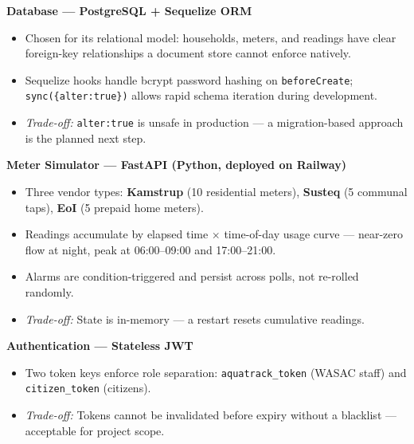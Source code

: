 
\textbf{Database --- PostgreSQL + Sequelize ORM}
\begin{itemize}
  \item Chosen for its relational model: households, meters, and readings have clear foreign-key relationships a document store cannot enforce natively.
  \item Sequelize hooks handle bcrypt password hashing on \texttt{beforeCreate}; \texttt{sync(\{alter:true\})} allows rapid schema iteration during development.
  \item \textit{Trade-off:} \texttt{alter:true} is unsafe in production --- a migration-based approach is the planned next step.
\end{itemize}

\vspace{0.3em}
\textbf{Meter Simulator --- FastAPI (Python, deployed on Railway)}
\begin{itemize}
  \item Three vendor types: \textbf{Kamstrup} (10 residential meters), \textbf{Susteq} (5 communal taps), \textbf{EoI} (5 prepaid home meters).
  \item Readings accumulate by elapsed time $\times$ time-of-day usage curve --- near-zero flow at night, peak at 06:00--09:00 and 17:00--21:00.
  \item Alarms are condition-triggered and persist across polls, not re-rolled randomly.
  \item \textit{Trade-off:} State is in-memory --- a restart resets cumulative readings.
\end{itemize}

\vspace{0.3em}
\textbf{Authentication --- Stateless JWT}
\begin{itemize}
  \item Two token keys enforce role separation: \texttt{aquatrack\_token} (WASAC staff) and \texttt{citizen\_token} (citizens).
  \item \textit{Trade-off:} Tokens cannot be invalidated before expiry without a blacklist --- acceptable for project scope.
\end{itemize}
